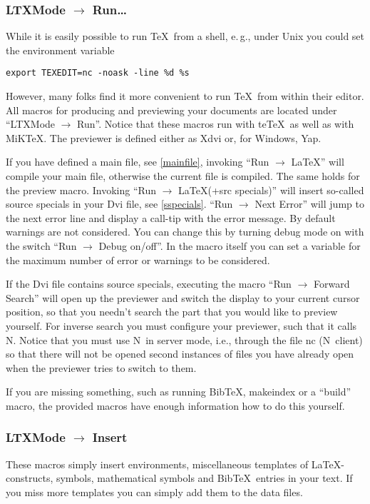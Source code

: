 \documentclass{article}
\newcommand{\nedit}{N\kern-0.8pt{Edit}}
\newcommand{\menu}[1]{``#1''}
\begin{document}
\subsubsection{LTXMode $\to$ Run\dots}\label{runlat}

While it is easily possible to run \TeX\ from a shell, e.\,g., under Unix you  could set the environment variable%
\begin{verbatim}
export TEXEDIT=nc -noask -line %d %s
\end{verbatim}
\noindent However, many folks find it more convenient to run \TeX\ from within their editor. All macros for producing and previewing your documents are located under \menu{LTXMode $\to$ Run}. 
Notice that these macros run with te\TeX\ as well as with MiK\TeX. The previewer is defined either as Xdvi or, for Windows, Yap.

If you have defined a main file, see \ref{mainfile}, invoking \menu{Run $\to$ \LaTeX} will compile your main file, otherwise the current file is compiled. The same holds for the preview macro. Invoking \menu{Run $\to$ \LaTeX (+src specials)} will insert so-called source specials in your Dvi file, see \ref{sspecials}.
\menu{Run $\to$ Next Error} will jump to the next error line and display a call-tip with the error message. By default warnings are not considered. You can change this by turning debug mode on with the switch \menu{Run $\to$ Debug on/off}. In the macro itself you can set a variable for the maximum number of error or warnings to be considered.

If the Dvi file contains source specials, executing the macro \menu{Run $\to$ Forward Search} will open up the previewer and switch the display to your current cursor position, so that you needn't search the part that you would like to preview yourself. For inverse search you must configure your previewer, such that it calls \nedit. Notice that you must use \nedit\ in server mode, i.e., through the file nc (\nedit\ client) so that there will not be opened  second instances of files you have already open when the previewer tries to switch to them.

If you are missing something, such as running Bib\TeX, makeindex or a ``build'' macro, the provided macros have enough information how to do this yourself.


\subsubsection{LTXMode $\to$ Insert}
These macros simply insert environments, miscellaneous templates of \LaTeX-constructs, symbols, mathematical symbols and Bib\TeX\ entries in your text. If you miss more templates you can simply add them to the data files.
\end{document}
